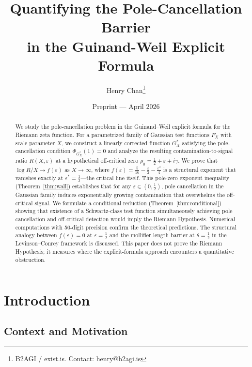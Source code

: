 \documentclass[12pt]{article}
\title{Quantifying the Pole-Cancellation Barrier\\
in the Guinand-Weil Explicit Formula}
\author{Henry Chan\thanks{B2AGI / exist.is. Contact: henry@b2agi.is}}
\date{Preprint --- April 2026}
\theoremstyle{remark}
\begin{document}
\maketitle

\begin{abstract}
We study the pole-cancellation problem in the Guinand--Weil explicit formula
for the Riemann zeta function. For a parametrized family of Gaussian test
functions $F_X$ with scale parameter $X$, we construct a linearly corrected
function $G_X^*$ satisfying the pole-cancellation condition
$\Phi_{G_X^*}(1)=0$ and analyze the resulting contamination-to-signal ratio
$R(X,\varepsilon)$ at a hypothetical off-critical zero
$\rho_0 = \tfrac{1}{2}+\varepsilon+i\gamma$. We prove that
$\log R / X \to f(\varepsilon)$ as $X\to\infty$, where
$f(\varepsilon) = \tfrac{5}{16} - \tfrac{\varepsilon}{2} -
\tfrac{\varepsilon^2}{4}$ is a structural exponent that vanishes exactly at
$\varepsilon^* = \tfrac{1}{2}$---the critical line itself. This pole-zero
exponent inequality (Theorem~\ref{thm:wall}) establishes that for any
$\varepsilon \in (0,\tfrac{1}{2})$, pole cancellation in the Gaussian family
induces exponentially growing contamination that overwhelms the off-critical
signal. We formulate a conditional reduction (Theorem~\ref{thm:conditional})
showing that existence of a Schwartz-class test function simultaneously
achieving pole cancellation and off-critical detection would imply the
Riemann Hypothesis. Numerical computations with 50-digit precision confirm
the theoretical predictions. The structural analogy between $f(\varepsilon)=0$
at $\varepsilon=\tfrac{1}{2}$ and the mollifier-length barrier at
$\theta=\tfrac{1}{2}$ in the Levinson--Conrey framework is discussed.
This paper does not prove the Riemann Hypothesis; it measures where
the explicit-formula approach encounters a quantitative obstruction.
\end{abstract}

\section{Introduction}

\subsection{Context and Motivation}
\end{document}
